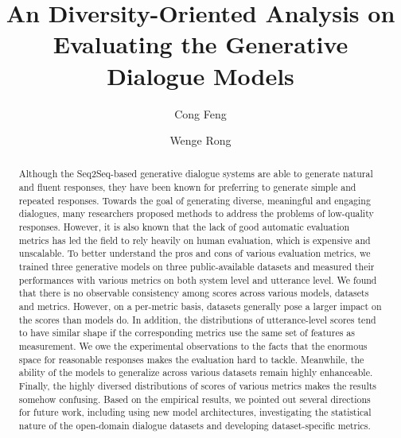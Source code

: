 \documentclass[runningheads]{llncs}
\begin{document}
\title{An Diversity-Oriented Analysis on Evaluating the Generative Dialogue Models}
%
%
\author{Cong Feng \and Wenge Rong}
%
%
%
%
\maketitle
%
\begin{abstract}
    Although the Seq2Seq-based generative dialogue systems are
    able to generate natural and
    fluent responses,
    they have been known for preferring to generate
    simple and repeated responses.
    Towards the goal of generating diverse, meaningful and
    engaging dialogues,
    many researchers proposed methods to address the
    problems of low-quality responses.
    However, it is also known that the
    lack of good automatic evaluation metrics
    has led the field to rely heavily on human evaluation,
    which is expensive and unscalable.
    To better understand the pros and cons of various
    evaluation metrics,
    we trained three generative models on
    three public-available datasets and measured their
    performances with various metrics on both system level
    and utterance level.
    We found that there is no observable consistency among scores
    across various models, datasets and metrics.
    However, on a per-metric basis, datasets generally pose a larger impact on
    the scores than models do.
    In addition, the distributions of
    utterance-level scores tend to have similar shape if the corresponding metrics
    use the same set of features as measurement.
    We owe the experimental observations to the facts
    that the enormous space for reasonable responses
    makes the evaluation hard to tackle.
    Meanwhile, the ability of the models to generalize across
    various datasets remain highly enhanceable.
    Finally, the highly diversed distributions of scores
    of various metrics makes the results somehow confusing.
    Based on the empirical results, we pointed out several
    directions for future work, including using new model
    architectures, investigating the statistical nature of
    the open-domain dialogue datasets and
    developing dataset-specific metrics.
\end{abstract}
%
%
\end{document}

